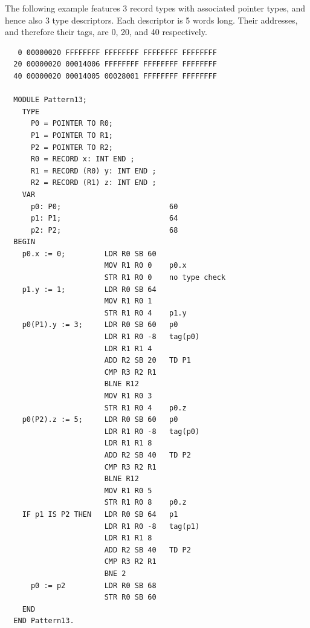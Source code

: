 The following example features 3 record types with associated pointer types, and hence also 3 type
descriptors. Each descriptor is 5 words long. Their addresses, and therefore their tags, are 0, 20,
and 40 respectively.
\begin{verbatim}
   0 00000020 FFFFFFFF FFFFFFFF FFFFFFFF FFFFFFFF
  20 00000020 00014006 FFFFFFFF FFFFFFFF FFFFFFFF
  40 00000020 00014005 00028001 FFFFFFFF FFFFFFFF
  
  MODULE Pattern13;
    TYPE
      P0 = POINTER TO R0;
      P1 = POINTER TO R1;
      P2 = POINTER TO R2;
      R0 = RECORD x: INT END ;
      R1 = RECORD (R0) y: INT END ;
      R2 = RECORD (R1) z: INT END ;
    VAR
      p0: P0;                         60 
      p1: P1;                         64
      p2: P2;                         68
  BEGIN
    p0.x := 0;         LDR R0 SB 60                  
                       MOV R1 R0 0    p0.x          
                       STR R1 R0 0    no type check
    p1.y := 1;         LDR R0 SB 64   
                       MOV R1 R0 1    
                       STR R1 R0 4    p1.y
    p0(P1).y := 3;     LDR R0 SB 60   p0
                       LDR R1 R0 -8   tag(p0)
                       LDR R1 R1 4    
                       ADD R2 SB 20   TD P1
                       CMP R3 R2 R1
                       BLNE R12
                       MOV R1 R0 3
                       STR R1 R0 4    p0.z    
    p0(P2).z := 5;     LDR R0 SB 60   p0
                       LDR R1 R0 -8   tag(p0)
                       LDR R1 R1 8    
                       ADD R2 SB 40   TD P2
                       CMP R3 R2 R1   
                       BLNE R12       
                       MOV R1 R0 5    
                       STR R1 R0 8    p0.z
    IF p1 IS P2 THEN   LDR R0 SB 64   p1
                       LDR R1 R0 -8   tag(p1)
                       LDR R1 R1 8    
                       ADD R2 SB 40   TD P2
                       CMP R3 R2 R1
                       BNE 2
      p0 := p2         LDR R0 SB 68
                       STR R0 SB 60
    END
  END Pattern13.
\end{verbatim}


